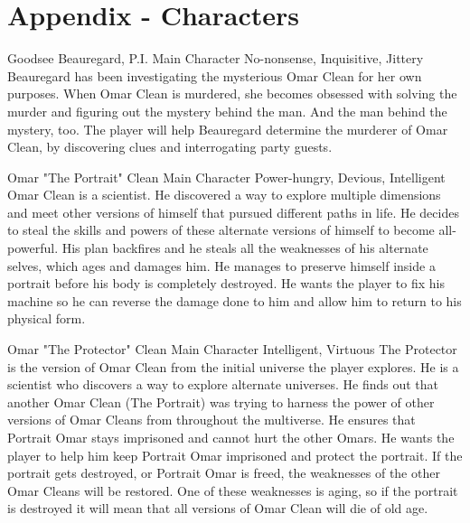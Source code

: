 \chapter{Appendix - Characters}
\label{app:characters}


{Goodsee Beauregard, P.I.}
{Main Character}
{No-nonsense, Inquisitive, Jittery}
{Beauregard has been investigating the mysterious Omar Clean for her own purposes. When Omar Clean is murdered, she becomes obsessed with solving the murder and figuring out the mystery behind the man. And the man behind the mystery, too.}
{The player will help Beauregard determine the murderer of Omar Clean, by discovering clues and interrogating party guests.}

{Omar "The Portrait" Clean}
{Main Character}
{Power-hungry, Devious, Intelligent}
{Omar Clean is a scientist. He discovered a way to explore multiple dimensions and meet other versions of himself that pursued different paths in life. He decides to steal the skills and powers of these alternate versions of himself to become all-powerful. His plan backfires and he steals all the weaknesses of his alternate selves, which ages and damages him. He manages to preserve himself inside a portrait before his body is completely destroyed.}
{He wants the player to fix his machine so he can reverse the damage done to him and allow him to return to his physical form.}

{Omar "The Protector" Clean}
{Main Character}
{Intelligent, Virtuous}
{The Protector is the version of Omar Clean from the initial universe the player explores. He is a scientist who discovers a way to explore alternate universes. He finds out that another Omar Clean (The Portrait) was trying to harness the power of other versions of Omar Cleans from throughout the multiverse. He ensures that Portrait Omar stays imprisoned and cannot hurt the other Omars.}
{He wants the player to help him keep Portrait Omar imprisoned and protect the portrait. If the portrait gets destroyed, or Portrait Omar is freed, the weaknesses of the other Omar Cleans will be restored. One of these weaknesses is aging, so if the portrait is destroyed it will mean that all versions of Omar Clean will die of old age.}

